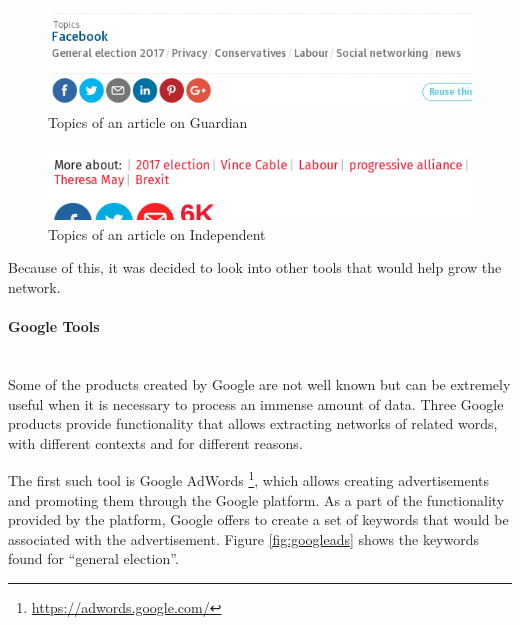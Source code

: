 \begin{figure}[ht]
\includegraphics[width=\textwidth]{guardianTags}
\caption{Topics of an article on Guardian}
\label{fig:guardianTags}
\end{figure}

\begin{figure}[ht]
\includegraphics[width=\textwidth]{indyTags}
\caption{Topics of an article on Independent}
\label{fig:indyTags}
\end{figure}

Because of this, it was decided to look into other tools that would help grow the network.

\paragraph{Google Tools}\mbox{}\\
Some of the products created by Google are not well known but can be extremely useful when it is necessary to process an immense amount of data. Three Google products provide functionality that allows extracting networks of related words, with different contexts and for different reasons.

The first such tool is Google AdWords \footnote{\url{https://adwords.google.com/}}, which allows creating advertisements and promoting them through the Google platform. As a part of the functionality provided by the platform, Google offers to create a set of keywords that would be associated with the advertisement. Figure \ref{fig:googleads} shows the keywords found for ``general election''. 

